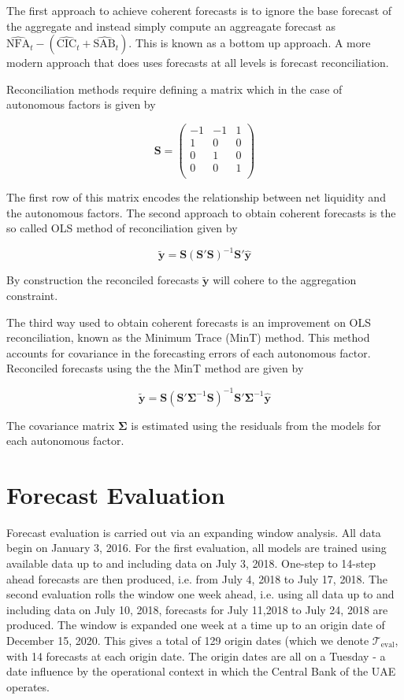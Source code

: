 The first approach to achieve coherent forecasts is to ignore the base forecast of the aggregate and instead simply compute an aggreagate forecast as 
$\hat{\textrm{NFA}}_t-(\hat{\textrm{CIC}}_t+\hat{\textrm{SAB}}_t)$. This is known as a bottom up approach. A more modern approach that does uses forecasts at all levels is forecast reconciliation.

Reconciliation methods require defining a matrix which in the case of autonomous factors is given by

\[
\mathbf{S}=\begin{pmatrix} -1 & -1 & 1\\
1 & 0 & 0\\
0 & 1 & 0\\
0 & 0 & 1\\
\end{pmatrix}
\]

The first row of this matrix encodes the relationship between net liquidity and the autonomous factors. The second approach to obtain coherent forecasts is the so called OLS method of reconciliation \citep{HynEtAl2011} given by

\[
\tilde{\mathbf{y}}=\mathbf{S}\left(\mathbf{S}'\mathbf{S}\right)^{-1}\mathbf{S}'\hat{\mathbf{y}}
\]

By construction the reconciled forecasts $\tilde{\mathbf{y}}$ will cohere to the aggregation constraint.

The third way used to obtain coherent forecasts is an improvement on OLS reconciliation, known as the Minimum Trace (MinT) method\citep{WicEtAl2019}.  This method accounts for covariance in the forecasting errors of each autonomous factor. Reconciled forecasts using the the MinT method are given by

\[
\tilde{\mathbf{y}}=\mathbf{S}\left(\mathbf{S}'\boldsymbol{\Sigma}^{-1}\mathbf{S}\right)^{-1}\mathbf{S}'\boldsymbol{\Sigma}^{-1}\hat{\mathbf{y}}
\]

The covariance matrix $\boldsymbol{\Sigma}$ is estimated using the residuals from the models for each autonomous factor.

\section{Forecast Evaluation}\label{sec:eval}

Forecast evaluation is carried out via an expanding window analysis. All data begin on January 3, 2016. For the first evaluation, all models are trained using available data up to and including data on July 3, 2018. One-step to 14-step ahead forecasts are then produced, i.e. from July 4, 2018 to July 17, 2018. The second evaluation rolls the window one week ahead, i.e. using all data up to and including data on July 10, 2018, forecasts for July 11,2018 to July 24, 2018 are produced. The window is expanded one week at a time up to an origin date of December 15, 2020. This gives a total of 129 origin dates (which we denote $\mathcal{T}_{\textrm{eval}}$, with 14 forecasts at each origin date. The origin dates are all on a Tuesday - a date influence by the operational context in which the Central Bank of the UAE operates.

